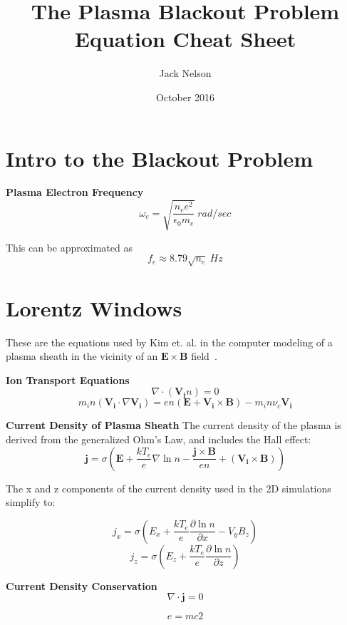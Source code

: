 \documentclass[]{tufte-handout}
\title{The Plasma Blackout Problem Equation Cheat Sheet}
\author{Jack Nelson}
\date{October 2016}
\begin{document}
\maketitle


\section{Intro to the Blackout Problem}
\textbf{Plasma Electron Frequency}
\begin{equation}
	\omega_e = \sqrt{\frac{n_e e^2}{\epsilon_0 m_e}} \ rad/sec
\end{equation}

This can be approximated as
\begin{equation}
	f_e \approx 8.79\sqrt{n_e} \ Hz
\end{equation}

\section{Lorentz Windows}
These are the equations used by Kim et. al. in the computer modeling of a plasma sheath in the vicinity of an $\mathbf{E}\times\mathbf{B}$ field~\cite{kim_analysis_2008}.

\textbf{Ion Transport Equations}
\begin{equation}
	\nabla \cdot (\mathbf{V_i} n) = 0
\end{equation}
\begin{equation}
	m_{ i }n(\mathbf { V_{ i } } \cdot \nabla \mathbf { V_{ i } } )=en(\mathbf { E } +\mathbf { V_{ i } } \times \mathbf { B } )-m_{ i }n\nu _{ c }\mathbf { V_{ i } }
\end{equation}

\textbf{Current Density of Plasma Sheath}
The current density of the plasma is derived from the generalized Ohm's Law, and includes the Hall effect:
\begin{equation}
	\mathbf{j} = \sigma \left(\mathbf{E} + \frac{kT_e}{e}\nabla \ln n - \frac{\mathbf{j} \times \mathbf{B}}{en} + \left(\mathbf{V_i} \times \mathbf{B}\right)\right)
\end{equation}

The x and z components of the current density used in the 2D simulations simplify to:

\begin{equation}
	j_x = \sigma \left(E_x + \frac{kT_e}{e} \frac{\partial \ln n}{\partial x} - V_yB_z\right)
\end{equation}
\begin{equation}
	j_z =\sigma \left(E_z + \frac{kT_e}{e}\frac{\partial\ln n}{\partial z}\right) 
\end{equation}

\textbf{Current Density Conservation}
\begin{equation}
\nabla \cdot \mathbf{j} = 0
\end{equation}

\begin{equation}
	e = mc2
\end{equation}



\end{document}

